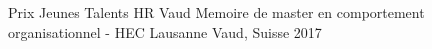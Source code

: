 \begin{cvhonors}
  \cvhonor
    {Prix Jeunes Talents HR Vaud}
    {Memoire de master en comportement organisationnel - HEC Lausanne}
    {Vaud, Suisse}
    {2017}
\end{cvhonors}
